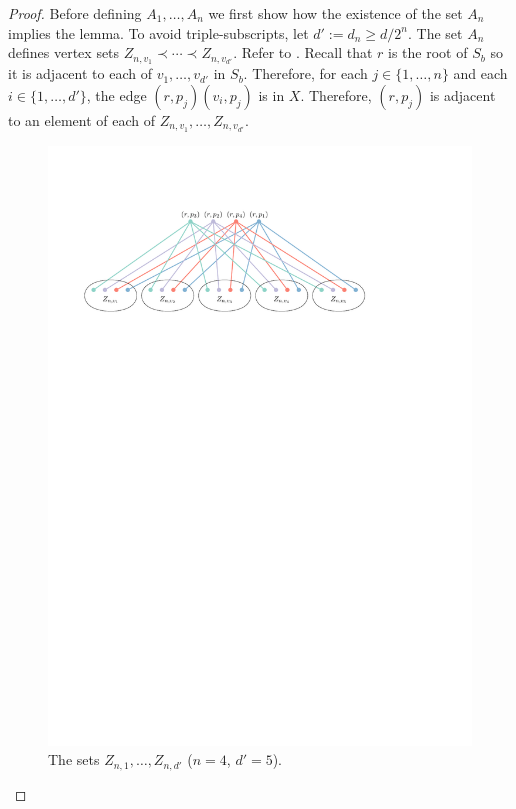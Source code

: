 \documentclass[kpfonts]{patmorin}
\renewcommand{\ge}{\geqslant}
\begin{document}
\begin{proof}
    Before defining $A_1,\ldots,A_n$ we first show how the existence of the set $A_n$ implies the lemma.  To avoid triple-subscripts, let $d':=d_n\ge d/2^n$.   The set $A_n$ defines vertex sets $Z_{n,v_1}\prec\cdots\prec Z_{n,v_{d'}}$.  Refer to . Recall that $r$ is the root of $S_b$ so it is adjacent to each of $v_{1},\ldots,v_{d'}$ in $S_b$.  Therefore, for each $j\in\{1,\ldots,n\}$ and each $i\in\{1,\ldots,d'\}$, the edge $(r,p_j)(v_i,p_j)$ is in $X$. Therefore, $(r,p_j)$ is adjacent to an element of each of $Z_{n,v_1},\ldots,Z_{n,v_{d'}}$.
	\begin{figure}
		\begin{center}
			\includegraphics{figs/twister}
		\end{center}
		\caption{The sets $Z_{n,1},\ldots,Z_{n,d'}$ ($n=4$, $d'=5$).}
	\end{figure}


\end{proof}
\end{document}
